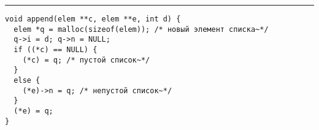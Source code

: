 \documentclass{article}
\begin{document}
\lstset{language = C,
    extendedchars = \true,
    keepspaces = true,
    breaklines=true,
    frame=lines}
\hrule
\begin{lstlisting}[title=\textbf {Алгоритм 1.6} Процедура Append — присоединение элемента в конец списк]
void append(elem **c, elem **e, int d) {
  elem *q = malloc(sizeof(elem)); /* новый элемент списка~*/
  q->i = d; q->n = NULL;
  if ((*c) == NULL) {
    (*c) = q; /* пустой список~*/
  }
  else {
    (*e)->n = q; /* непустой список~*/
  }
  (*e) = q;
}
\end{lstlisting}
\end{document}
